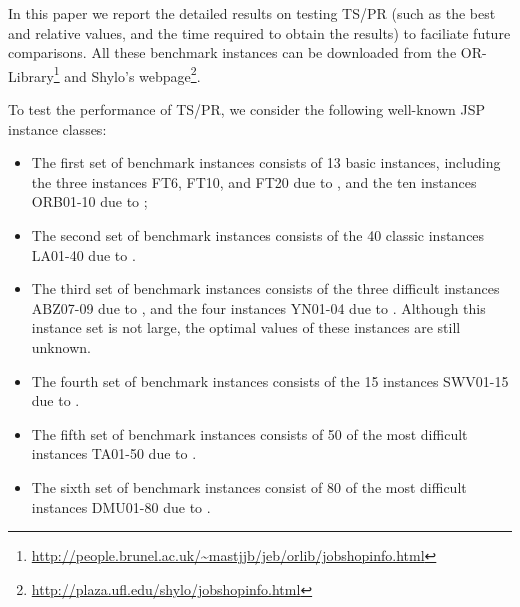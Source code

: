\documentclass[authoryear,12pt]{elsarticle}
\begin{document}
\begin{table}[!h]\begin{scriptsize}
\caption{The settings of the time limit for different categories of instances}
\label{Time_limit}
\end{scriptsize}
\end{table}


In this paper we report the detailed results on testing TS/PR (such as the best and relative values, and the time required to obtain the results) to faciliate future comparisons. All these benchmark instances can be downloaded from the OR-Library\footnote{\url{http://people.brunel.ac.uk/~mastjjb/jeb/orlib/jobshopinfo.html}} and Shylo's webpage\footnote{\url{http://plaza.ufl.edu/shylo/jobshopinfo.html}}.

To test the performance of TS/PR, we consider the following well-known JSP instance classes:

\begin{itemize}
  \item The first set of benchmark instances consists of 13 basic instances, including the three instances FT6, FT10, and FT20 due to \cite{Fisher1963FT06-20}, and the ten instances ORB01-10 due to \cite{ApplegateSpring1991ORB01-10};
  \item The second set of benchmark instances consists of the 40 classic instances LA01-40 due to \cite{Lawrence1984LA01-40}.
  \item The third set of benchmark instances consists of the three difficult instances ABZ07-09 due to \cite{Adams1988LA01-40}, and the four instances YN01-04 due to \cite{Yamada1992YN1-4}. Although this instance set is not large, the optimal values of these instances are still unknown.
  \item The fourth set of benchmark instances consists of the 15 instances SWV01-15 due to \cite{Storer1992SWV01-15}.
  \item The fifth set of benchmark instances consists of 50 of the most difficult instances TA01-50 due to \cite{TaillardSpring1994TA01-50}.
  \item The sixth set of benchmark instances consist of 80 of the most difficult instances DMU01-80 due to \cite{Demirkol1997DMU01-80}.
\end{itemize}
\end{document}
